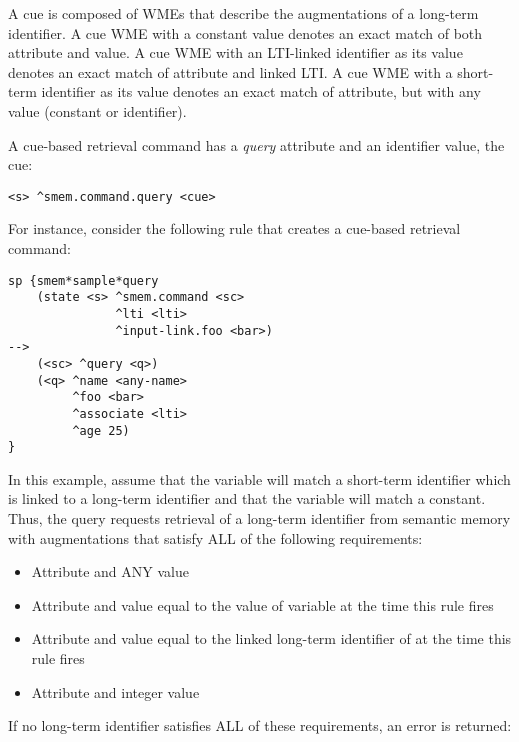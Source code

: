 A cue is composed of WMEs that describe the augmentations of a long-term identifier.  
A cue WME with a constant value denotes an exact match of both attribute and value.  
A cue WME with an LTI-linked identifier as its value denotes an exact match of attribute and linked LTI.  
A cue WME with a short-term identifier as its value denotes an exact match of attribute, but with any value (constant or identifier).  

A cue-based retrieval command has a \emph{query} attribute and an identifier value, the cue:

\begin{verbatim}
<s> ^smem.command.query <cue>
\end{verbatim}

For instance, consider the following rule that creates a cue-based retrieval command:

\begin{verbatim}
sp {smem*sample*query
    (state <s> ^smem.command <sc>
               ^lti <lti>
               ^input-link.foo <bar>)
-->
    (<sc> ^query <q>)
    (<q> ^name <any-name>
         ^foo <bar>
         ^associate <lti>
         ^age 25)
}
\end{verbatim}

In this example, assume that the  variable will match a short-term identifier which is linked to a long-term identifier and that the  variable will match a constant.  
Thus, the query requests retrieval of a long-term identifier from semantic memory with augmentations that satisfy ALL of the following requirements:

\begin{itemize}

\item 
Attribute  and ANY value

\item 
Attribute  and value equal to the value of variable  at the time this rule fires

\item 
Attribute  and value equal to the linked long-term identifier of  at the time this rule fires

\item 
Attribute  and integer value 

\end{itemize}

If no long-term identifier satisfies ALL of these requirements, an error is returned:

